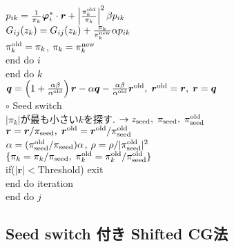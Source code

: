 \documentclass[12pt,titlepage]{jarticle}
\begin{document}
\\\hspace{2.0cm}
$p_{i k} = \frac{1}{\pi_k} {\boldsymbol \varphi}_i^* \cdot {\boldsymbol r} + 
\left|\frac{\pi^{\rm old}_k}{\pi_k } \right|^2 \beta p_{i k}$
\\\hspace{2.0cm}
$G_{i j}(z_k) = G_{i j}(z_k) + \frac{\pi_k}{\pi_k^{\rm new}} \alpha p_{i k}$
\\\hspace{2.0cm}
$\pi_k^{\rm old} = \pi_k$, $\pi_k = \pi_k^{\rm new}$
\\\hspace{1.5cm}
end do $i$
\\\hspace{1.0cm}
end do $k$
\\\hspace{1.0cm}
${\boldsymbol q} = \left( 1 + \frac{\alpha \beta}{\alpha^{\rm old}} \right) {\boldsymbol r}
- \alpha {\boldsymbol q} - \frac{\alpha \beta}{\alpha^{\rm old}} {\boldsymbol r}^{\rm old},\; 
{\boldsymbol r}^{\rm old} = {\boldsymbol r},\; {\boldsymbol r} = {\boldsymbol q}$
\\\hspace{1.0cm}
$\circ$ Seed switch
\\\hspace{1.0cm}
$|\pi_k|$が最も小さい$k$を探す. 
$\rightarrow z_{\rm seed},\; \pi_{\rm seed},\; \pi_{\rm seed}^{\rm old} $
\\\hspace{1.0cm}
${\boldsymbol r} = {\boldsymbol r} / \pi_{\rm seed},\; 
{\boldsymbol r}^{\rm old} = {\boldsymbol r}^{\rm old} / \pi_{\rm seed}^{\rm old}$
\\\hspace{1.0cm}
$\alpha = (\pi_{\rm seed}^{\rm old} / \pi_{\rm seed}) \alpha$,
$\rho = \rho / |\pi_{\rm seed}^{\rm old}|^2$
\\\hspace{1.0cm}
$\{\pi_k = \pi_k/\pi_{\rm seed},\; \pi_k^{\rm old} = \pi_k^{\rm old} / \pi_{\rm seed}^{\rm old}\}$
\\\hspace{1.0cm}
if($|{\boldsymbol r}| < $Threshold) exit
\\\hspace{0.5cm}
end do iteration
\\
end do $j$

\subsection{Seed switch 付き Shifted CG法}
\end{document}

